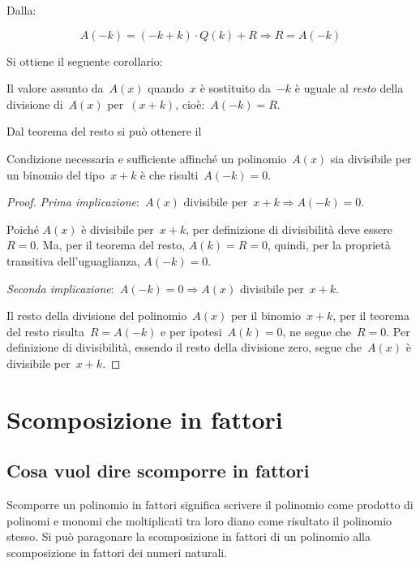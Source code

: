 Dalla:

\[A(-k)=(-k+k) \cdot Q(k)+R \Longrightarrow R=A(-k)\]

Si ottiene il seguente corollario:

Il valore assunto da~\(A(x)\) quando~\(x\) è sostituito da~\(-k\)
è uguale al \emph{resto} della divisione di~\(A(x)\) per~\((x+k)\), 
cioè:~\(A(-k)=R\).

Dal teorema del resto si può ottenere il

\begin{teorema}[di Ruffini]
Condizione necessaria e sufficiente affinché un polinomio~\(A(x)\) 
sia divisibile per un binomio del tipo~\(x+k\) è
che risulti~\(A(-k)=0\).
\end{teorema}

\begin{proof}

\emph{Prima implicazione}:~\(A(x)\) divisibile per~\(x+k\Rightarrow A(-k)=0\).

Poiché \(A(x)\) è divisibile per~\(x+k\), per definizione di divisibilità deve 
essere~\(R=0\). 
Ma, per il teorema del resto, \(A(k)=R=0\), 
quindi, per la proprietà transitiva dell'uguaglianza, \(A(-k)=0\).

\emph{Seconda implicazione}:~\(A(-k)=0\Rightarrow A(x)\) divisibile per~\(x+k\).

Il resto della divisione del polinomio~\(A(x)\) per il binomio~\(x+k\),
per il teorema del resto risulta~\(R=A(-k)\) e per ipotesi~\(A(k)=0\),
ne segue che~\(R=0\). Per definizione di divisibilità, essendo il
resto della divisione zero, segue che~\(A(x)\) è divisibile per~\(x+k\).
\end{proof}


\section{Scomposizione in fattori}

\subsection{Cosa vuol dire scomporre in fattori}
\label{subsec:divpol_scomporre}

Scomporre un polinomio in fattori significa scrivere il polinomio come 
prodotto di polinomi e monomi che
moltiplicati tra loro diano come risultato il polinomio stesso. 
Si può paragonare la scomposizione in fattori
di un polinomio alla scomposizione in fattori dei numeri naturali.

